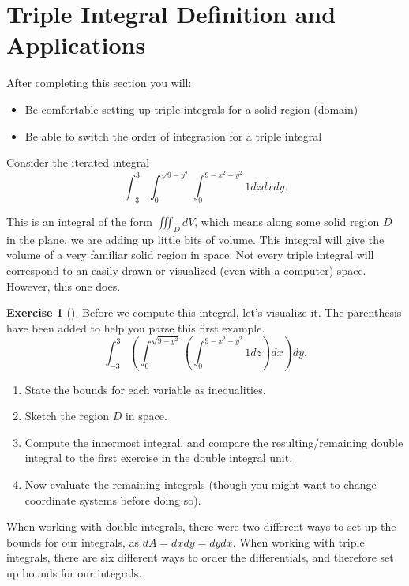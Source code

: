 \documentclass[10pt,]{book}
\theoremstyle{plain}
\theoremstyle{definition}
\theoremstyle{definition}
\theoremstyle{definition}
\theoremstyle{definition}
\newtheorem{exploration}[project]{Exercise}
\theoremstyle{definition}
\numberwithin{equation}{section}
\newcommand{\ds}{\displaystyle}
\begin{document}
\section[{Triple Integral Definition and Applications}]{Triple Integral Definition and Applications}\label{section-46}
After completing this section you will: \leavevmode%
\begin{itemize}[label=\textbullet]
\item{}Be comfortable setting up triple integrals for a solid region (domain)%
\item{}Be able to switch the order of integration for a triple integral%
\end{itemize}
%
\par
Consider the iterated integral%
\begin{equation*}
\ds \int_{-3}^3 \int_0^{\sqrt{9-y^2}}\int_0^{9-x^2-y^2} 1dzdxdy.
\end{equation*}
%
\par
This is an integral of the form \(\iiint_D dV\), which means along some solid region \(D\) in the plane, we are adding up little bits of volume. This integral will give the volume of a very familiar solid region in space. Not every triple integral will correspond to an easily drawn or visualized (even with a computer) space. However, this one does.%
\begin{exploration}[]\label{exploration-294}
Before we compute this integral, let's visualize it. The parenthesis have been added to help you parse this first example.%
\begin{equation*}
\ds \int_{-3}^3 (\int_0^{\sqrt{9-y^2}} (\int_0^{9-x^2-y^2} 1dz) dx ) dy.
\end{equation*}
%
\begin{enumerate}[font=\bfseries,label=(\alph*),ref=\alph*]
\item\label{task-815} State the bounds for each variable as inequalities.%
\item\label{task-816} Sketch the region \(D\) in space.%
\item\label{task-817} Compute the innermost integral, and compare the resulting/remaining double integral to the first exercise in the double integral unit.%
\item\label{task-818} Now evaluate the remaining integrals (though you might want to change coordinate systems before doing so).%
\end{enumerate}
\end{exploration}
When working with double integrals, there were two different ways to set up the bounds for our integrals, as \(dA=dxdy=dydx\). When working with triple integrals, there are six different ways to order the differentials, and therefore set up bounds for our integrals.%
\end{document}
